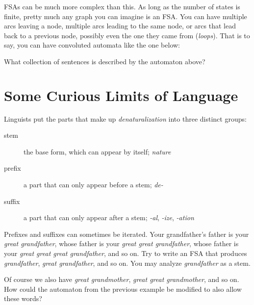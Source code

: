 FSAs can be much more complex than this.
As long as the number of states is finite, pretty much any graph you can imagine is an FSA\@.
You can have multiple arcs leaving a node, multiple arcs leading to the same node, or arcs that lead back to a previous node, possibly even the one they came from (\emph{loops}).
That is to say, you can have convoluted automata like the one below:
%
\begin{center}
\end{center}

\medskip
\begin{homework}
    What collection of sentences is described by the automaton above?
\end{homework}

\section{Some Curious Limits of Language}

Linguists put the parts that make up \emph{denaturalization} into three distinct groups:
%
\begin{description}
    \item[stem] the base form, which can appear by itself; \emph{nature}
    \item[prefix] a part that can only appear before a stem; \emph{de-}
    \item[suffix] a part that can only appear after a stem; \emph{-al}, \emph{-ize}, \emph{-ation}
\end{description}
%
\begin{homework}
    Prefixes and suffixes can sometimes be iterated.
    Your grandfather's father is your \emph{great grandfather}, whose father is your \emph{great great grandfather}, whose father is your \emph{great great great grandfather}, and so on.
    Try to write an FSA that produces \emph{grandfather}, \emph{great grandfather}, and so on.
    You may analyze \emph{grandfather} as a stem.
\end{homework}
%
\begin{homework}
    Of course we also have \emph{great grandmother}, \emph{great great grandmother}, and so on.
    How could the automaton from the previous example be modified to also allow these words?
\end{homework}

